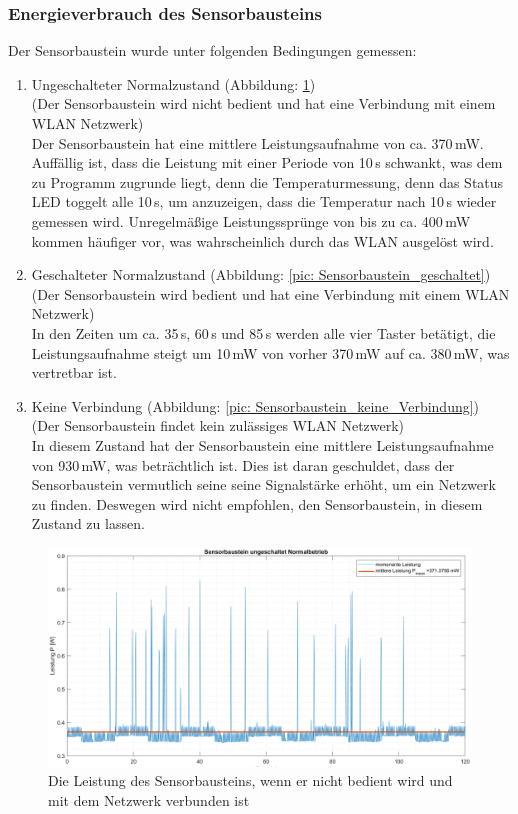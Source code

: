 \subsubsection{Energieverbrauch des Sensorbausteins} \label{energie_sensorbaustein}
Der Sensorbaustein wurde unter folgenden Bedingungen gemessen:
\begin{enumerate}
	\item Ungeschalteter Normalzustand (Abbildung: \ref{pic: Sensorbaustein_ungeschaltet}) \\(Der Sensorbaustein wird nicht bedient und hat eine Verbindung mit einem WLAN Netzwerk) \\
	Der Sensorbaustein hat eine mittlere Leistungsaufnahme von ca. 370\,mW. Auffällig ist, dass die Leistung mit einer Periode von 10\,s schwankt, was dem zu Programm zugrunde liegt, denn die Temperaturmessung, denn das Status LED toggelt alle 10\,s, um anzuzeigen, dass die Temperatur nach 10\,s wieder gemessen wird. Unregelmäßige Leistungssprünge von bis zu ca. 400\,mW kommen häufiger vor, was wahrscheinlich durch das WLAN ausgelöst wird.
	\\
	\item Geschalteter Normalzustand (Abbildung: \ref{pic: Sensorbaustein_geschaltet})\\ (Der Sensorbaustein wird bedient und hat eine Verbindung mit einem WLAN Netzwerk)\\
	In den Zeiten um ca. 35\,s, 60\,s und 85\,s werden alle vier Taster betätigt, die Leistungsaufnahme steigt um 10\,mW von vorher 370\,mW auf ca. 380\,mW, was vertretbar ist.
	\\
	\item Keine Verbindung (Abbildung: \ref{pic: Sensorbaustein_keine_Verbindung})\\ (Der Sensorbaustein findet kein zulässiges WLAN Netzwerk)\\
	In diesem Zustand hat der Sensorbaustein eine mittlere Leistungsaufnahme von 930\,mW, was beträchtlich ist. Dies ist daran geschuldet, dass der Sensorbaustein vermutlich seine seine Signalstärke erhöht, um ein Netzwerk zu finden. Deswegen wird nicht empfohlen, den Sensorbaustein, in diesem Zustand zu lassen.
\end{enumerate}


\begin{figure}[H]
	\centering
	\includegraphics[width=1\textwidth]{graphics/Sensorbaustein_ungeschaltet.png}
	\caption{Die Leistung des Sensorbausteins, wenn er nicht bedient wird und mit dem Netzwerk verbunden ist}
	\label{pic: Sensorbaustein_ungeschaltet}
\end{figure}

